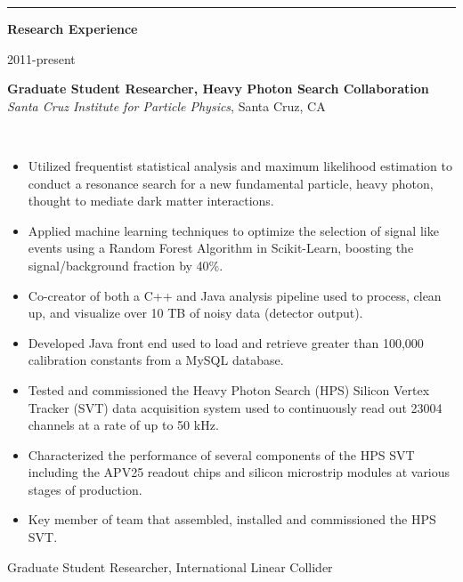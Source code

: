\documentclass[11pt]{article}
\newcommand{\cvsection}[1] {
    \noindent
    \textcolor{indigodye}{\rule{.15\textwidth}{.1in} \hspace{0.01 \textwidth} \textbf{\Large{#1}}} \newline 
}
\newcommand{\experienceentry}[5] { 
    \noindent
    \begin{minipage}[t]{0.15\textwidth} \begin{flushright} #1 \end{flushright} \end{minipage} \hspace{0.01\textwidth}
    \begin{minipage}[t]{0.84\textwidth} 
        \textbf{#2} \newline
        \emph{#3}, #4 
    \end{minipage} \\[0.01pt]
    #5 \vspace{11pt}
}
\begin{document}
    \cvsection{Research Experience}
        \experienceentry{2011-present}
                        {Graduate Student Researcher, Heavy Photon Search Collaboration}
                        {Santa Cruz Institute for Particle Physics}
                        {Santa Cruz, CA}
                        {   
                            \begin{itemize}[label=\textcolor{indigodye}{$\circ$}, noitemsep, nolistsep, leftmargin=0.19\textwidth]
                              \item Utilized frequentist statistical analysis and maximum likelihood estimation to conduct a 
                                    resonance search for a new fundamental particle, heavy photon, thought to mediate dark matter 
                                    interactions.
                              \item Applied machine learning techniques to optimize the selection of signal like 
                                    events using a Random Forest Algorithm in Scikit-Learn, boosting the 
                                    signal/background fraction by 40\%.
                              \item Co-creator of both a C++ and Java analysis pipeline used to process, clean up,
                                    and visualize over 10 TB of noisy data (detector output).
                              \item Developed Java front end used to load and retrieve greater than 100,000 
                                    calibration constants from a MySQL database.
                              \item Tested and commissioned the Heavy Photon Search (HPS) Silicon Vertex Tracker (SVT) data
                                    acquisition system used to continuously read out 23004 channels at a rate of up to
                                    50 kHz.
                              \item Characterized the performance of several components of the HPS SVT
                                    including the APV25 readout chips and silicon microstrip modules at various stages
                                    of production.
                              \item Key member of team that assembled, installed and commissioned the HPS SVT.
                          \end{itemize} 
                      } 
                        {Graduate Student Researcher, International Linear Collider}
\end{document}
